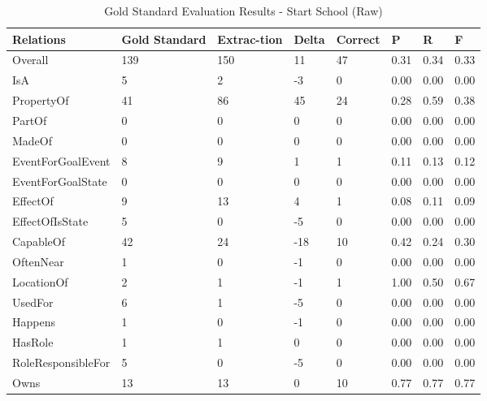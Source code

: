 \begin{table}[H]   %
\centering
\caption{Gold Standard Evaluation Results - Start School (Raw)} \vspace{0.25em}
\begin{tabular}{|p{3.5cm}|p{2cm}|p{1.5cm}|p{1cm}|p{1.5cm}|p{1cm}|p{1cm}|p{1cm}|} \hline
\textbf{Relations} & \textbf{Gold Standard} & \textbf{Extrac-tion} & \textbf{Delta} & \textbf{Correct} & \textbf{P} & \textbf{R} & \textbf{F} \\ \hline
Overall & 139 & 150 & 11 & 47 & 0.31 & 0.34 & 0.33 \\ \hline
IsA & 5 & 2 & -3 & 0 & 0.00 & 0.00 & 0.00 \\ \hline
PropertyOf & 41 & 86 & 45 & 24 & 0.28 & 0.59 & 0.38 \\ \hline
PartOf  & 0 & 0 & 0 & 0 & 0.00 & 0.00 & 0.00 \\ \hline
MadeOf & 0 & 0 & 0 & 0 & 0.00 & 0.00 & 0.00 \\ \hline
EventForGoalEvent & 8 & 9 & 1 & 1 & 0.11 & 0.13 & 0.12 \\ \hline
EventForGoalState & 0 & 0 & 0 & 0 & 0.00 & 0.00 & 0.00 \\ \hline
EffectOf & 9 & 13 & 4 & 1 & 0.08 & 0.11 & 0.09 \\ \hline
EffectOfIsState & 5 & 0 & -5 & 0 & 0.00 & 0.00 & 0.00 \\ \hline
CapableOf & 42 & 24 & -18 & 10 & 0.42 & 0.24 & 0.30 \\ \hline
OftenNear & 1 & 0 & -1 & 0 & 0.00 & 0.00 & 0.00 \\ \hline
LocationOf & 2 & 1 & -1 & 1 & 1.00 & 0.50 & 0.67 \\ \hline
UsedFor & 6 & 1 & -5 & 0 & 0.00 & 0.00 & 0.00 \\ \hline
Happens & 1 & 0 & -1 & 0 & 0.00 & 0.00 & 0.00 \\ \hline
HasRole & 1 & 1 & 0 & 0 & 0.00 & 0.00 & 0.00 \\ \hline
RoleResponsibleFor & 5 & 0 & -5 & 0 & 0.00 & 0.00 & 0.00 \\ \hline
Owns & 13 & 13 & 0 & 10 & 0.77 & 0.77 & 0.77 \\ \hline
\end{tabular}
\label{tab:gold3}
\end{table}

